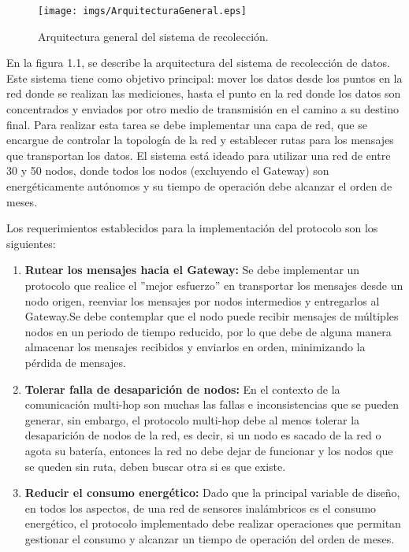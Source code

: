 \begin{figure}[H]
\texttt{[image: imgs/ArquitecturaGeneral.eps]} 
\caption{Arquitectura general del sistema de recolección.}
\end{figure}

En la figura 1.1, se describe la arquitectura del sistema de recolección de datos. Este sistema tiene como objetivo principal: mover los datos desde los puntos en la red donde se realizan las mediciones, hasta el punto en la red donde los datos son concentrados y enviados por otro medio de transmisión en el camino a su destino final. Para realizar esta tarea se debe implementar una capa de red, que se encargue de controlar la topología de la red y establecer rutas para los mensajes que transportan los datos. El sistema está ideado para utilizar una red de entre 30 y 50 nodos, donde todos los nodos (excluyendo el Gateway) son energéticamente autónomos y su tiempo de operación debe alcanzar el orden de meses.

Los requerimientos establecidos para la implementación del protocolo son los siguientes:

\begin{enumerate}
\item \textbf{Rutear los mensajes hacia el Gateway:} Se debe implementar un protocolo que realice el ''mejor esfuerzo'' en transportar los mensajes desde un nodo origen, reenviar los mensajes por nodos intermedios y entregarlos al Gateway.Se debe contemplar que el nodo puede recibir mensajes de múltiples nodos en un periodo de tiempo reducido, por lo que debe de alguna manera almacenar los mensajes recibidos y enviarlos en orden, minimizando la pérdida de mensajes.\\

\item \textbf{Tolerar falla de desaparición de nodos:} En el contexto de la comunicación multi-hop son muchas las fallas e inconsistencias que se pueden generar, sin embargo, el protocolo multi-hop debe al menos tolerar la desaparición de nodos de la red, es decir, si un nodo es sacado de la red o agota su batería, entonces la red no debe dejar de funcionar y los nodos que se queden sin ruta, deben buscar otra si es que existe.\\

\item\textbf{Reducir el consumo energético:} Dado que la principal variable de diseño, en todos los aspectos, de una red de sensores inalámbricos es el consumo energético, el protocolo implementado debe realizar operaciones que permitan gestionar el consumo y alcanzar un tiempo de operación del orden de meses. \\
\end{enumerate}

